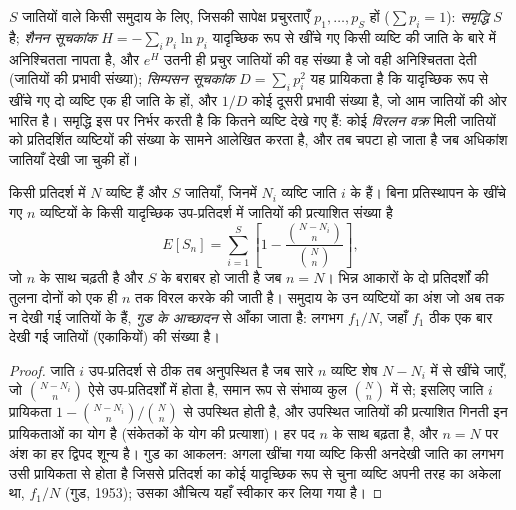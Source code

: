 \begin{definition}[विविधता]\label{def:b3:microbiomes:diversity}
$S$ जातियों वाले किसी समुदाय के लिए, जिसकी सापेक्ष प्रचुरताएँ $p_{1},\dots,
p_{S}$ हों ($\sum p_{i} = 1$): \emph{समृद्धि} $S$ है;
\emph{शैनन सूचकांक} $H = -\sum_{i} p_{i}\ln p_{i}$ यादृच्छिक रूप से
खींचे गए किसी व्यष्टि की जाति के बारे में अनिश्चितता नापता है, और
$e^{H}$ उतनी ही प्रचुर जातियों की वह संख्या है जो वही अनिश्चितता देती
(जातियों की प्रभावी संख्या); \emph{सिम्पसन सूचकांक}
$D = \sum_{i} p_{i}^{2}$ यह प्रायिकता है कि यादृच्छिक रूप से खींचे गए
दो व्यष्टि एक ही जाति के हों, और $1/D$ कोई दूसरी प्रभावी संख्या है, जो
आम जातियों की ओर भारित है। समृद्धि इस पर निर्भर करती है कि कितने
व्यष्टि देखे गए हैं: कोई \emph{विरलन वक्र} मिली जातियों को प्रतिदर्शित
व्यष्टियों की संख्या के सामने आलेखित करता है, और तब चपटा हो जाता है जब
अधिकांश जातियाँ देखी जा चुकी हों।
\end{definition}

\begin{theorem}[विरलन]\label{thm:b3:microbiomes:rarefaction}
किसी प्रतिदर्श में $N$ व्यष्टि हैं और $S$ जातियाँ, जिनमें $N_{i}$
व्यष्टि जाति $i$ के हैं। बिना प्रतिस्थापन के खींचे गए $n$ व्यष्टियों के
किसी यादृच्छिक उप-प्रतिदर्श में जातियों की प्रत्याशित संख्या है
\[
E[S_{n}] = \sum_{i=1}^{S}\left[1 - \frac{\binom{N - N_{i}}{n}}
{\binom{N}{n}}\right],
\]
जो $n$ के साथ चढ़ती है और $S$ के बराबर हो जाती है जब $n = N$। भिन्न
आकारों के दो प्रतिदर्शों की तुलना दोनों को एक ही $n$ तक विरल करके की
जाती है। समुदाय के उन व्यष्टियों का अंश जो अब तक न देखी गई जातियों के
हैं, \emph{गुड के आच्छादन} से आँका जाता है: लगभग $f_{1}/N$, जहाँ
$f_{1}$ ठीक एक बार देखी गई जातियों (एकाकियों) की संख्या है।
\end{theorem}
\begin{proof}
जाति $i$ उप-प्रतिदर्श से ठीक तब अनुपस्थित है जब सारे $n$ व्यष्टि शेष
$N - N_{i}$ में से खींचे जाएँ, जो $\binom{N - N_{i}}{n}$ ऐसे
उप-प्रतिदर्शों में होता है, समान रूप से संभाव्य कुल $\binom{N}{n}$ में
से; इसलिए जाति $i$ प्रायिकता $1 - \binom{N-N_{i}}{n}/
\binom{N}{n}$ से उपस्थित होती है, और उपस्थित जातियों की प्रत्याशित
गिनती इन प्रायिकताओं का योग है (संकेतकों के योग की प्रत्याशा)। हर पद
$n$ के साथ बढ़ता है, और $n = N$ पर अंश का हर द्विपद शून्य है। गुड का
आकलन: अगला खींचा गया व्यष्टि किसी अनदेखी जाति का लगभग उसी प्रायिकता से
होता है जिससे प्रतिदर्श का कोई यादृच्छिक रूप से चुना व्यष्टि अपनी तरह
का अकेला था, $f_{1}/N$ (गुड, 1953); उसका औचित्य यहाँ स्वीकार कर लिया
गया है।
\end{proof}

